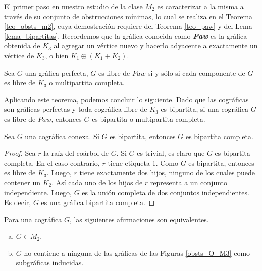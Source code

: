 El primer paso en nuestro estudio de la clase $M_2$ es caracterizar a la
misma a través de su conjunto de obstrucciones mínimas, lo cual se realiza 
en el Teorema \ref{teo_obsts_m2}, cuya demostración requiere del Teorema
\ref{teo_paw} y del Lema \ref{lema_bipartitas}. Recordemos que
la gr\'afica conocida como \textbf{\emph{Paw}} es la gr\'afica obtenida de
$K_3$ al agregar un v\'ertice nuevo y hacerlo adyacente a exactamente un
v\'ertice de $K_3$, o bien $K_1 \oplus (K_1 + K_2)$.

\begin{theorem} \label{teo_paw}
	Sea $G$ una gráfica perfecta, $G$ es libre de $Paw$ si y sólo si cada componente de $G$ es libre de $K_3$ o multipartita completa.
\end{theorem}

Aplicando este teorema, podemos concluir lo siguiente. Dado que las cográficas son gráficas perfectas y toda cográfica libre de $K_3$ es bipartita, si una cográfica $G$ es libre de $Paw$, entonces $G$ es bipartita o multipartita completa.

\begin{lemma} \label{lema_bipartitas}
Sea $G$ una cográfica conexa. Si $G$ es bipartita, entonces $G$ es bipartita completa.
\end{lemma}

\begin{proof}
Sea $r$ la raíz del coárbol de $G$. Si $G$ es trivial, es claro que $G$ es bipartita completa. En el caso contrario, $r$ tiene etiqueta 1. Como $G$ es bipartita, entonces es libre de $K_3$. Luego, $r$ tiene exactamente dos hijos, ninguno de los cuales puede contener un $K_2$. Así cada uno de los hijos de $r$ representa a un conjunto independiente. Luego, $G$ es la unión completa de dos conjuntos independientes. Es decir, $G$ es una gráfica bipartita completa.
\end{proof}

\begin{theorem} \label{teo_obsts_m2}

    Para una cográfica $G$, las siguientes afirmaciones son equivalentes.
    \begin{enumerate}[(a)]
        \item $G \in M_2$.
        \item $G$ no contiene a ninguna de las gráficas de las Figuras \ref{obsts_O_M3} como subgráficas inducidas.
    \end{enumerate}

\end{theorem}

